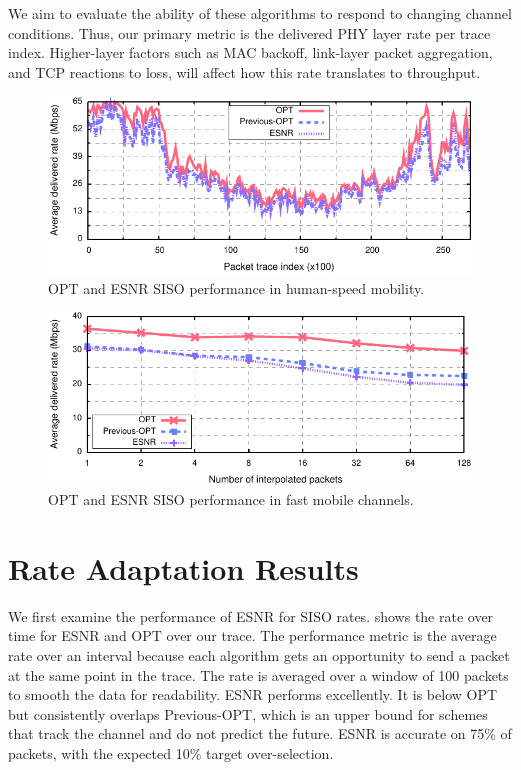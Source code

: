 We aim to evaluate the ability of these algorithms to respond to changing channel conditions. Thus, our primary metric is the delivered PHY layer rate per trace index. Higher-layer factors such as MAC backoff, link-layer packet aggregation, and TCP reactions to loss, will affect how this rate translates to throughput.

\begin{figure}[t]
      \centering
      \includegraphics[width=0.95\columnwidth]{figures/rate/siso_rate_time_opt_eff.pdf}
      \caption{\label{fig:siso_rate_time_opt_eff} OPT and ESNR SISO performance in human-speed mobility.}
\end{figure}

\begin{figure}[t]
      \centering
      \includegraphics[width=0.95\columnwidth]{figures/rate/siso_rate_skip_opt_eff.pdf}
      \caption{\label{fig:siso_rate_skip_opt_eff} OPT and ESNR SISO performance in fast mobile channels.}
\end{figure}



\section{Rate Adaptation Results}
 We first examine the performance of ESNR for SISO rates.  shows the rate over time for ESNR and OPT over our trace. The performance metric is the average rate over an interval because each algorithm gets an opportunity to send a packet at the same point in the trace. The rate is averaged over a window of 100 packets to smooth the data for readability. ESNR performs excellently. It is below OPT but consistently overlaps Previous-OPT, which is an upper bound for schemes that track the channel and do not predict the future. ESNR is accurate on 75\% of packets, with the expected 10\% target over-selection.

